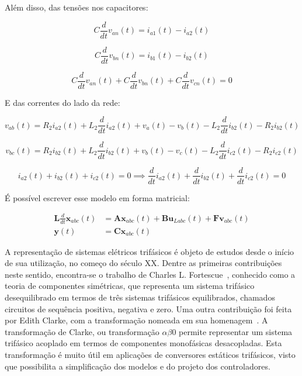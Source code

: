     Além disso, das tensões nos capacitores:

    \begin{equation*}
        C \frac{d}{dt} v_{an}(t) = i_{a1}(t) - i_{a2}(t)
    \end{equation*}

    \begin{equation*}
        C \frac{d}{dt} v_{bn}(t) = i_{b1}(t) - i_{b2}(t)
    \end{equation*}

    \begin{equation*}
        C \frac{d}{dt} v_{an}(t) + C \frac{d}{dt} v_{bn}(t) + C \frac{d}{dt} v_{cn}(t) = 0
    \end{equation*}

    E das correntes do lado da rede:

    \begin{equation*}
        v_{ab}(t) = R_2 i_{a2}(t) + L_2 \frac{d}{dt} i_{a2}(t) + v_a(t) - v_b(t)
            - L_2 \frac{d}{dt} i_{b2}(t) - R_2 i_{b2}(t)
    \end{equation*}

    \begin{equation*}
        v_{bc}(t) = R_2 i_{b2}(t) + L_2 \frac{d}{dt} i_{b2}(t) + v_b(t) - v_c(t)
            - L_2 \frac{d}{dt} i_{c2}(t) - R_2 i_{c2}(t)
    \end{equation*}

    \begin{equation*}
        i_{a2}(t) + i_{b2}(t) + i_{c2}(t) = 0 \implies \frac{d}{dt} i_{a2}(t) +
            \frac{d}{dt} i_{b2}(t) + \frac{d}{dt} i_{c2}(t) = 0
    \end{equation*}

    É possível escrever esse modelo em forma matricial:

    \begin{equation*}
        \begin{split}
            \mathbf{L} \frac{d}{dt} \mathbf{x}_{abc}(t) & = \mathbf{Ax}_{abc}(t) +
                \mathbf{Bu}_{Labc}(t) + \mathbf{Fv}_{abc}(t) \\
            \mathbf{y}(t) & = \mathbf{Cx}_{abc}(t)
        \end{split}
    \end{equation*}

    A representação de sistemas elétricos trifásicos é objeto de estudos desde o
    início de sua utilização, no começo do século XX. Dentre as primeiras contribuições
    neste sentido, encontra-se o trabalho de Charles L. Fortescue~\cite{ref:FORTESCUE},
    conhecido como a teoria de componentes simétricas, que representa um sistema trifásico
    desequilibrado em termos de três sistemas trifásicos equilibrados, chamados circuitos
    de sequência positiva, negativa e zero. Uma outra contribuição foi feita por Edith
    Clarke, com a transformação nomeada em sua homenagem~\cite{ref:CLARKE}. A transformação
    de Clarke, ou transformação $\alpha \beta 0$ permite representar um sistema trifásico
    acoplado em termos de componentes monofásicas desacopladas. Esta transformação é muito
    útil em aplicações de conversores estáticos trifásicos, visto que possibilita a
    simplificação dos modelos e do projeto dos controladores.

